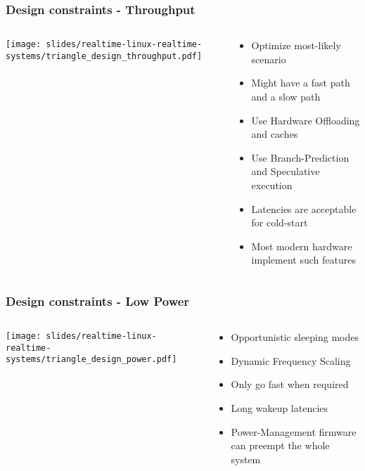 \begin{frame}
	\frametitle{Design constraints - Throughput}
	\begin{columns}
	\begin{column}{0.35\textwidth}
	\texttt{[image: slides/realtime-linux-realtime-systems/triangle\_design\_throughput.pdf]}
	\end{column}
		\begin{column}{0.65\textwidth}
			\begin{itemize}
				\item Optimize most-likely scenario
				\item Might have a fast path and a slow path
				\item Use Hardware Offloading and caches
				\item Use Branch-Prediction and Speculative execution
				\item Latencies are acceptable for cold-start
				\item Most modern hardware implement such features
			\end{itemize}
		\end{column}
	\end{columns}
\end{frame}

\begin{frame}
	\frametitle{Design constraints - Low Power}
	\begin{columns}
	\begin{column}{0.35\textwidth}
	\texttt{[image: slides/realtime-linux-realtime-systems/triangle\_design\_power.pdf]}
	\end{column}
		\begin{column}{0.65\textwidth}
			\begin{itemize}
				\item Opportunistic sleeping modes
				\item Dynamic Frequency Scaling
				\item Only go fast when required
				\item Long wakeup latencies
				\item Power-Management firmware can preempt the whole system
			\end{itemize}
		\end{column}
	\end{columns}
\end{frame}

